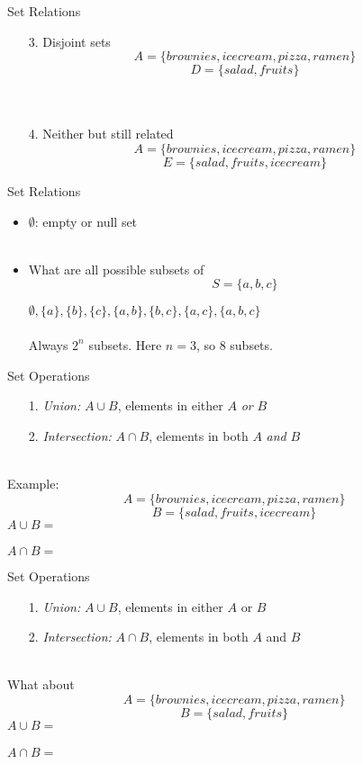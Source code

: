 \documentclass{./../../Latex/teaching_slides}
\begin{document}
\begin{frame}{Set Relations}
\begin{itemize}
\item[3.] Disjoint sets $$ A = \{brownies, icecream, pizza, ramen\} $$
$$ D = \{salad, fruits\} $$ \\~\\
\item[4.] \pause Neither but still related  $$ A = \{brownies, icecream, pizza, ramen\} $$
$$ E = \{salad, fruits, icecream\} $$
\end{itemize}
\end{frame}

\begin{frame}{Set Relations}
\begin{itemize}
\item $\emptyset$: empty or null set \\~\\
\item \pause What are all possible subsets of $$S = \{a,b,c\}$$
\item[] \pause $\emptyset, \{a\}, \{b\},\{c\}, \{a,b\}, \{b,c\}, \{a,c\}, \{a,b,c\}$  \\~\\
\pause Always $2^n$ subsets. Here $n=3$, so 8 subsets.
\end{itemize}
\end{frame}

\begin{frame}{Set Operations}
\begin{itemize}
\item[1.] \textit{Union:} $A \cup B$, elements in either $A$ \textit{or} $B$
\item[2.] \textit{Intersection:} $A \cap B$, elements in both $A$ \textit{and} $B$ \\~\\
\end{itemize}
Example: 
$$ A = \{brownies, icecream, pizza, ramen\} $$
$$ B = \{salad, fruits, icecream\} $$
$A \cup B = $ \\~\\
$A \cap B = $
\end{frame}

\begin{frame}{Set Operations}
\begin{itemize}
\item[1.] \textit{Union:} $A \cup B$, elements in either $A$ or $B$
\item[2.] \textit{Intersection:} $A \cap B$, elements in both $A$ and $B$ \\~\\
\end{itemize}
What about
$$ A = \{brownies, icecream, pizza, ramen\} $$
$$ B = \{salad, fruits\} $$
$A \cup B = $ \\~\\
$A \cap B = $
\end{frame}
\end{document}
